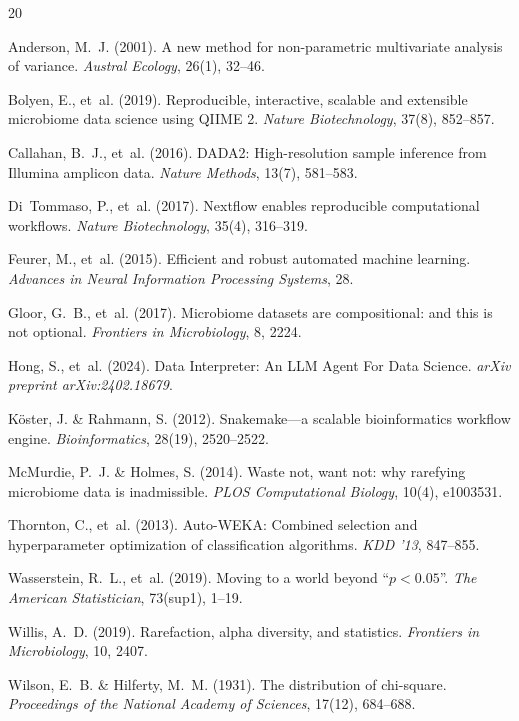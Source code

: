 \documentclass[11pt,a4paper]{article}
\begin{document}
\begin{thebibliography}{20}

Anderson, M.~J. (2001).
A new method for non-parametric multivariate analysis of variance.
\textit{Austral Ecology}, 26(1), 32--46.

Bolyen, E., et~al. (2019).
Reproducible, interactive, scalable and extensible microbiome data
science using QIIME 2.
\textit{Nature Biotechnology}, 37(8), 852--857.

Callahan, B.~J., et~al. (2016).
DADA2: High-resolution sample inference from Illumina amplicon data.
\textit{Nature Methods}, 13(7), 581--583.

Di~Tommaso, P., et~al. (2017).
Nextflow enables reproducible computational workflows.
\textit{Nature Biotechnology}, 35(4), 316--319.

Feurer, M., et~al. (2015).
Efficient and robust automated machine learning.
\textit{Advances in Neural Information Processing Systems}, 28.

Gloor, G.~B., et~al. (2017).
Microbiome datasets are compositional: and this is not optional.
\textit{Frontiers in Microbiology}, 8, 2224.

Hong, S., et~al. (2024).
Data Interpreter: An LLM Agent For Data Science.
\textit{arXiv preprint arXiv:2402.18679}.

K{\"o}ster, J. \& Rahmann, S. (2012).
Snakemake---a scalable bioinformatics workflow engine.
\textit{Bioinformatics}, 28(19), 2520--2522.

McMurdie, P.~J. \& Holmes, S. (2014).
Waste not, want not: why rarefying microbiome data is inadmissible.
\textit{PLOS Computational Biology}, 10(4), e1003531.

Thornton, C., et~al. (2013).
Auto-WEKA: Combined selection and hyperparameter optimization of
classification algorithms.
\textit{KDD '13}, 847--855.

Wasserstein, R.~L., et~al. (2019).
Moving to a world beyond ``$p < 0.05$''.
\textit{The American Statistician}, 73(sup1), 1--19.

Willis, A.~D. (2019).
Rarefaction, alpha diversity, and statistics.
\textit{Frontiers in Microbiology}, 10, 2407.

Wilson, E.~B. \& Hilferty, M.~M. (1931).
The distribution of chi-square.
\textit{Proceedings of the National Academy of Sciences}, 17(12), 684--688.

\end{thebibliography}
\end{document}
